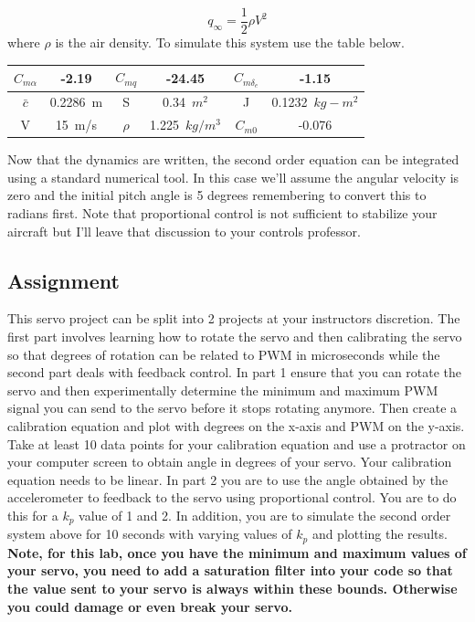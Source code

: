 \begin{equation}
q_{\infty} = \frac{1}{2}\rho V^2
\end{equation}
where $\rho$ is the air density. To simulate this system use the table below.
\begin{table}[H]
\begin{center}
\begin{tabular}{c|c|c|c|c|c}
$C_{m\alpha}$ & -2.19 & $C_{mq}$ & -24.45 & $C_{m\delta_e}$ & -1.15 \\
\hline
$\bar{c}$ & 0.2286~m & S & 0.34~$m^2$ & J & 0.1232~$kg-m^2$ \\
\hline
V & 15~m/s & $\rho$ & 1.225~$kg/m^3$ & $C_{m0}$ & -0.076 \\
\end{tabular}
\end{center}
\end{table}
Now that the dynamics are written, the second order equation can be integrated using a standard numerical tool. In this case we'll assume the angular velocity is zero and the initial pitch angle is 5 degrees remembering to convert this to radians first. Note that proportional control is not sufficient to stabilize your aircraft but I’ll leave that discussion to your controls professor. 

\subsection{Assignment}

This servo project can be split into 2 projects at your instructors discretion. The first part involves learning how to rotate the servo and then calibrating the servo so that degrees of rotation can be related to PWM in microseconds while the second part deals with feedback control. In part 1 ensure that you can rotate the servo and then experimentally determine the minimum and maximum PWM signal you can send to the servo before it stops rotating anymore. Then create a calibration equation and plot with degrees on the x-axis and PWM on the y-axis. Take at least 10 data points for your calibration equation and use a protractor on your computer screen to obtain angle in degrees of your servo. Your calibration equation needs to be linear. In part 2 you are to use the angle obtained by the accelerometer to feedback to the servo using proportional control. You are to do this for a $k_p$ value of 1 and 2. In addition, you are to simulate the second order system above for 10 seconds with varying values of $k_p$ and plotting the results. {\bf Note, for this lab, once you have the minimum and maximum values of your servo, you need to add a saturation filter into your code so that the value sent to your servo is always within these bounds. Otherwise you could damage or even break your servo.}

